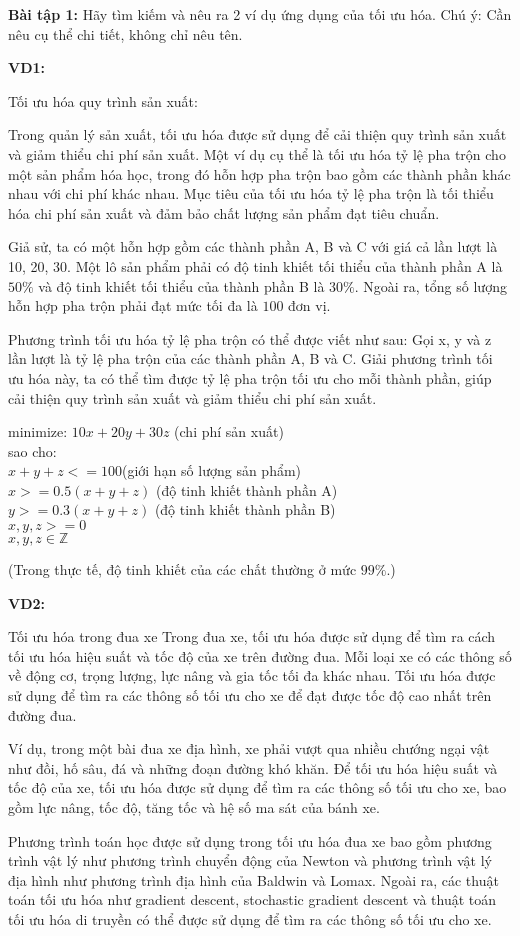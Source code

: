 \textbf{Bài tập 1:}
Hãy tìm kiếm và nêu ra 2 ví dụ ứng dụng của tối ưu hóa.
Chú ý: Cần nêu cụ thể chi tiết, không chỉ nêu tên.

\textbf{VD1:} 

Tối ưu hóa quy trình sản xuất:

Trong quản lý sản xuất, tối ưu hóa được 
sử dụng để cải thiện quy trình sản xuất và giảm thiểu chi phí sản xuất.
 Một ví dụ cụ thể là tối ưu hóa tỷ lệ pha trộn cho một sản phẩm hóa học, 
 trong đó hỗn hợp pha trộn bao gồm các thành phần khác nhau với chi phí 
 khác nhau. Mục tiêu của tối ưu hóa tỷ lệ pha trộn là tối thiểu hóa chi
phí sản xuất và đảm bảo chất lượng sản phẩm đạt tiêu chuẩn.

Giả sử, ta có một hỗn hợp gồm các thành phần A, B và C với giá
 cả lần lượt là 10, 20, 30. 
 Một lô sản phẩm phải có độ tinh khiết tối thiểu của thành phần A là $50\%$
  và độ tinh khiết tối thiểu của thành phần B là $30\%$.
 Ngoài ra, tổng số lượng hỗn hợp pha trộn phải đạt mức tối 
 đa là $100$ đơn vị.


Phương trình tối ưu hóa tỷ lệ pha trộn có thể được viết như sau:
Gọi x, y và z lần lượt là tỷ lệ pha trộn của các thành phần A, B và C.
 Giải phương trình tối ưu hóa này, ta có thể tìm được
  tỷ lệ pha trộn tối ưu cho mỗi thành phần, giúp cải thiện quy trình sản xuất và giảm thiểu chi phí sản xuất.

minimize: $10x + 20y + 30z$ (chi phí sản xuất)\\
sao cho:\\
$x + y + z <= 100 $(giới hạn số lượng sản phẩm)\\
$x >= 0.5(x+y+z)$ (độ tinh khiết thành phần A)\\
$y >= 0.3(x+y+z)$ (độ tinh khiết thành phần B)\\
$x,y,z >= 0 $\\
$x,y,z \in \mathbb{Z}$

(Trong thực tế, độ tinh khiết của các chất thường ở mức $99\%$.)

\textbf{VD2:} 

Tối ưu hóa trong đua xe 
Trong đua xe, tối ưu hóa được sử dụng để tìm ra cách tối ưu hóa hiệu suất và tốc độ của xe trên đường đua. Mỗi loại xe có các thông số về động cơ, trọng lượng, lực nâng và gia tốc tối đa khác nhau. Tối ưu hóa được sử dụng để tìm ra các thông số tối ưu cho xe để đạt được tốc độ cao nhất trên đường đua.

Ví dụ, trong một bài đua xe địa hình, xe phải vượt qua nhiều chướng ngại vật như đồi, hố sâu, đá và những đoạn đường khó khăn. Để tối ưu hóa hiệu suất và tốc độ của xe, tối ưu hóa được sử dụng để tìm ra các thông số tối ưu cho xe, bao gồm lực nâng, tốc độ, tăng tốc và hệ số ma sát của bánh xe.

Phương trình toán học được sử dụng trong tối ưu hóa đua xe bao gồm phương trình vật lý như phương trình chuyển động của Newton và phương trình vật lý địa hình như phương trình địa hình của Baldwin và Lomax. Ngoài ra, các thuật toán tối ưu hóa như gradient descent, stochastic gradient descent và thuật toán tối ưu hóa di truyền
 có thể được sử dụng để tìm ra các thông số tối ưu cho xe.
